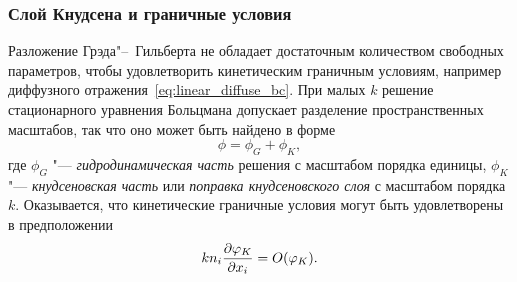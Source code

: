 \subsubsection{Слой Кнудсена и граничные условия}

Разложение Грэда"--~Гильберта не обладает достаточным количеством свободных параметров,
чтобы удовлетворить кинетическим граничным условиям, например диффузного отражения~\eqref{eq:linear_diffuse_bc}.
При малых \(k\) решение стационарного уравнения Больцмана допускает разделение пространственных масштабов,
так что оно может быть найдено в форме
\begin{equation}\label{eq:gh:sum_solutions}
    \phi = \phi_G + \phi_K,
\end{equation}
где \(\phi_G\) "--- \emph{гидродинамическая часть} решения с масштабом порядка единицы,
\(\phi_K\) "--- \emph{кнудсеновская часть} или \emph{поправка кнудсеновского слоя} с масштабом порядка \(k\).
Оказывается, что кинетические граничные условия могут быть удовлетворены в предположении
\begin{equation}\label{eq:gh:knudsen_assumption}
    kn_i\pder[\phi_K]{x_i} = \OO{\phi_K}.
\end{equation}

